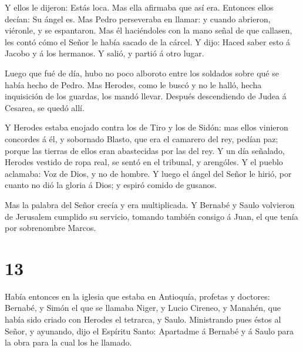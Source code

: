  Y ellos le dijeron: Estás loca. Mas ella afirmaba que así
era. Entonces ellos decían: Su ángel es.  Mas Pedro
perseveraba en llamar: y cuando abrieron, viéronle, y se espantaron.
 Mas él haciéndoles con la mano señal de que callasen, les
contó cómo el Señor le había sacado de la cárcel. Y dijo: Haced saber
esto á Jacobo y á los hermanos. Y salió, y partió á otro lugar.

 Luego que fué de día, hubo no poco alboroto entre los
soldados sobre qué se había hecho de Pedro.  Mas Herodes,
como le buscó y no le halló, hecha inquisición de los guardas, los mandó
llevar. Después descendiendo de Judea á Cesarea, se quedó allí.

 Y Herodes estaba enojado contra los de Tiro y los de
Sidón: mas ellos vinieron concordes á él, y sobornado Blasto, que era el
camarero del rey, pedían paz; porque las tierras de ellos eran
abastecidas por las del rey.  Y un día señalado, Herodes
vestido de ropa real, se sentó en el tribunal, y arengóles.
 Y el pueblo aclamaba: Voz de Dios, y no de hombre.
 Y luego el ángel del Señor le hirió, por cuanto no dió la
gloria á Dios; y espiró comido de gusanos.

 Mas la palabra del Señor crecía y era multiplicada.
 Y Bernabé y Saulo volvieron de Jerusalem cumplido su
servicio, tomando también consigo á Juan, el que tenía por sobrenombre
Marcos.

\hypertarget{section-12}{%
\section{13}\label{section-12}}

 Había entonces en la iglesia que estaba en Antioquía,
profetas y doctores: Bernabé, y Simón el que se llamaba Niger, y Lucio
Cireneo, y Manahén, que había sido criado con Herodes el tetrarca, y
Saulo.  Ministrando pues éstos al Señor, y ayunando, dijo el
Espíritu Santo: Apartadme á Bernabé y á Saulo para la obra para la cual
los he llamado.

